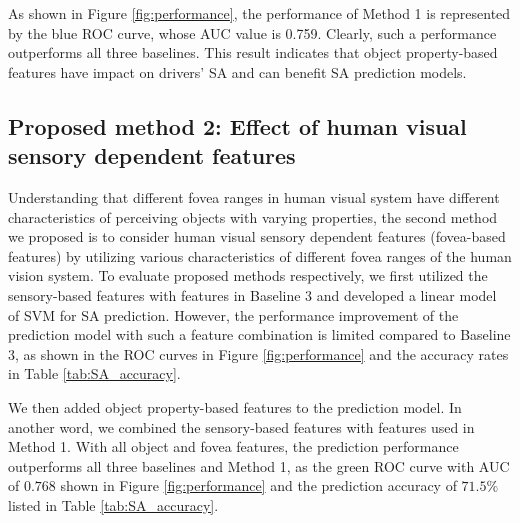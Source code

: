 \documentclass[letterpaper, 10 pt, conference]{ieeeconf}  %
\begin{document}
As shown in Figure \ref{fig:performance}, the performance of Method 1 is represented by the blue ROC curve, whose AUC value is 0.759. Clearly, such a performance outperforms all three baselines. This result indicates that object property-based features have impact on drivers' SA and can benefit SA prediction models.

\subsection{Proposed method 2: Effect of human visual sensory dependent features}

Understanding that different fovea ranges in human visual system have different characteristics of perceiving objects with varying properties, the second method we proposed is to consider human visual sensory dependent features (fovea-based features) by utilizing various characteristics of different fovea ranges of the human vision system. To evaluate proposed methods respectively, we first utilized the sensory-based features with features in Baseline 3 and developed a linear model of SVM for SA prediction. However, the performance improvement of the prediction model with such a feature combination is limited compared to Baseline 3, as shown in the ROC curves in Figure \ref{fig:performance} and the accuracy rates in Table \ref{tab:SA_accuracy}.

We then added object property-based features to the prediction model. In another word, we combined the sensory-based features with features used in Method 1. With all object and fovea features, the prediction performance outperforms all three baselines and Method 1, as the green ROC curve with AUC of $0.768$ shown in Figure \ref{fig:performance} and the prediction accuracy of $71.5\%$ listed in Table \ref{tab:SA_accuracy}.

\end{document}

